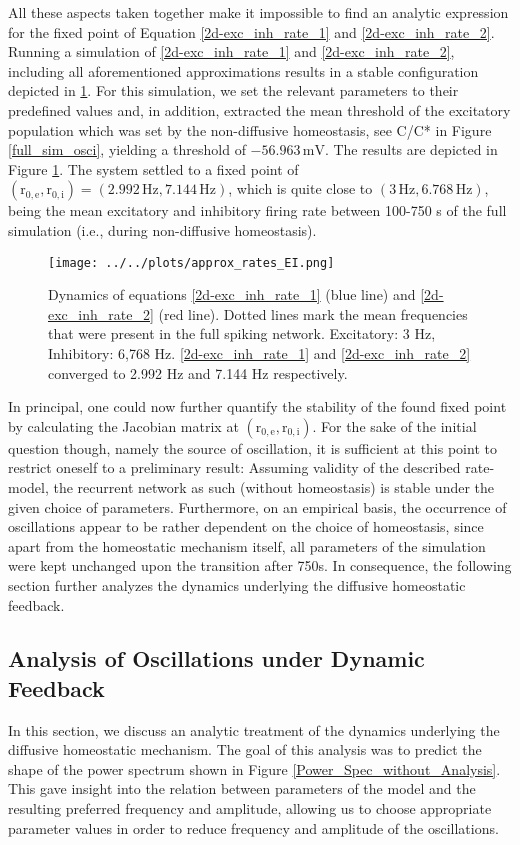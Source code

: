 \documentclass[10pt,a4paper]{article}
\begin{document}
All these aspects taken together make it impossible to find an analytic expression for the fixed point of Equation \ref{2d-exc_inh_rate_1} and \ref{2d-exc_inh_rate_2}. Running a simulation of \ref{2d-exc_inh_rate_1} and \ref{2d-exc_inh_rate_2}, including all aforementioned approximations results in a stable configuration depicted in \ref{Dyn_Rate_Approx}. For this simulation, we set the relevant parameters to their predefined values and, in addition, extracted the mean threshold of the excitatory population which was set by the non-diffusive homeostasis, see C/C* in Figure \ref{full_sim_osci}, yielding a threshold of $\mathrm{-56.963\, mV}$. The results are depicted in Figure \ref{Dyn_Rate_Approx}. The system settled to a fixed point of $\mathrm{(r_{0,e},r_{0,i}) = (2.992\, Hz, 7.144\, Hz)}$, which is quite close to $\mathrm{(3\, Hz, 6.768\, Hz)}$, being the mean excitatory and inhibitory firing rate between 100-750 s of the full simulation (i.e., during non-diffusive homeostasis).
\begin{figure}
\begin{center}
\texttt{[image: ../../plots/approx\_rates\_EI.png]}
\end{center}
\caption{Dynamics of equations \ref{2d-exc_inh_rate_1} (blue line) and \ref{2d-exc_inh_rate_2} (red line). Dotted lines mark the mean frequencies that were present in the full spiking network. Excitatory: 3 Hz, Inhibitory: 6,768 Hz. \ref{2d-exc_inh_rate_1} and \ref{2d-exc_inh_rate_2} converged to 2.992 Hz and 7.144 Hz respectively.}
\label{Dyn_Rate_Approx}
\end{figure}
In principal, one could now further quantify the stability of the found fixed point by calculating the Jacobian matrix at $\mathrm{(r_{0,e},r_{0,i})}$. For the sake of the initial question though, namely the source of oscillation, it is sufficient at this point to restrict oneself to a preliminary result: Assuming validity of the described rate-model, the recurrent network as such (without homeostasis) is stable under the given choice of parameters. Furthermore, on an empirical basis, the occurrence of oscillations appear to be rather dependent on the choice of homeostasis, since apart from the homeostatic mechanism itself, all parameters of the simulation were kept unchanged upon the transition after 750s. In consequence, the following section further analyzes the dynamics underlying the diffusive homeostatic feedback.

\subsection{Analysis of Oscillations under Dynamic Feedback}\label{theor_osc}
In this section, we discuss an analytic treatment of the dynamics underlying the diffusive homeostatic mechanism. The goal of this analysis was to predict the shape of the power spectrum shown in Figure \ref{Power_Spec_without_Analysis}. This gave insight into the relation between parameters of the model and the resulting preferred frequency and amplitude, allowing us to choose appropriate parameter values in order to reduce frequency and amplitude of the oscillations.
\end{document}
